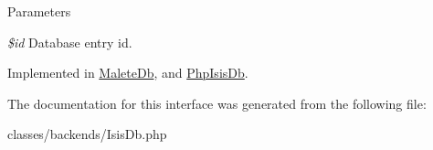 \begin{DoxyParams}{Parameters}
\item[{\em \$id}]Database entry id. \end{DoxyParams}


Implemented in \hyperlink{classMaleteDb_ad2a65876db24adc388afce465e0c153e}{MaleteDb}, and \hyperlink{classPhpIsisDb_af2266931746f6f2335b831be8b8333fb}{PhpIsisDb}.



The documentation for this interface was generated from the following file:\begin{DoxyCompactItemize}
\item 
classes/backends/IsisDb.php\end{DoxyCompactItemize}
